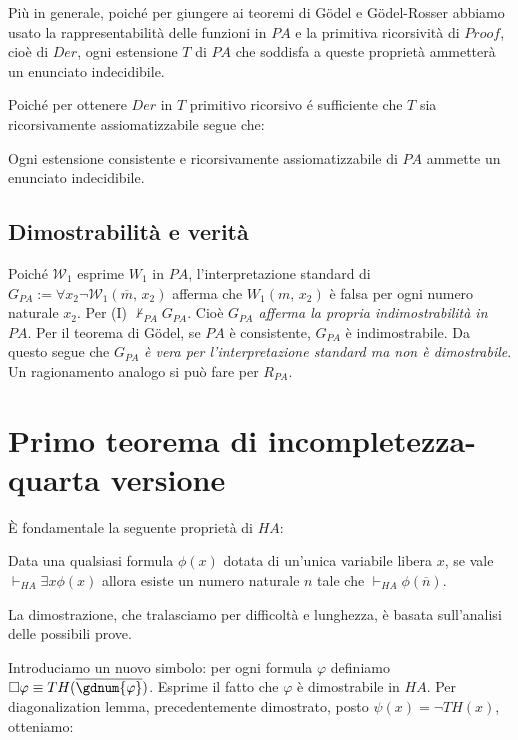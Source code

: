 	Pi\`u in generale, poich\'e per giungere ai teoremi
	di G\"odel e G\"odel-Rosser abbiamo
	usato la rappresentabilit\`a delle funzioni in $PA$ e la primitiva
	ricorsivit\`a di $Proof$, cio\`e di $Der$, ogni estensione $T$ di $PA$ che
	soddisfa a queste propriet\`a ammetter\`a un enunciato indecidibile.
	
	Poich\'e per ottenere $Der$ in $T$ primitivo ricorsivo \'e sufficiente
	che $T$ sia ricorsivamente assiomatizzabile segue che:
	
	\begin{thm}
	Ogni estensione consistente e ricorsivamente assiomatizzabile di $PA$
	ammette un enunciato indecidibile.
	\end{thm}
	
\subsection{Dimostrabilit\`a e verit\`a}
	
	Poich\'e $\mathcal{W}_1$ esprime $W_1$ in $PA$,
	l'interpretazione standard di $G_{PA}:=\forall x_2\neg
	\mathcal{W}_1(\overline{m},\,x_2)$ afferma che $W_1(m,\,x_2)$ \`e falsa per
	ogni numero naturale $x_2$. Per (I) $\not\vdash_{PA}G_{PA}$.
	Cio\`e \textit{$G_{PA}$ afferma la propria indimostrabilit\`a in
	$PA$}. Per il teorema di G\"odel, se $PA$ \`e consistente,
	$G_{PA}$ \`e indimostrabile. Da questo segue che $G_{PA}$ \textit{\`e vera per
	l'interpretazione standard ma non \`e dimostrabile}. Un ragionamento analogo
	si pu\`o fare per $R_{PA}$.
	
\section{Primo teorema di incompletezza-quarta versione}

	\`E fondamentale la seguente propriet\`a di $HA$:

	\begin{thm}
	Data una qualsiasi formula $\phi(x)$ dotata di un'unica variabile libera $x$,
	se vale $\vdash_{HA}\exists x\phi(x)$ allora esiste un numero naturale
	$n$ tale che $\vdash_{HA}\phi(\overline{n})$.
	\end{thm}
	La dimostrazione, che tralasciamo per difficolt\`a e lunghezza,
	\`e basata sull'analisi delle possibili prove.

	Introduciamo un nuovo
	simbolo: per ogni formula $\varphi$ definiamo
	$\Box\varphi\equiv TH(\overline{\gdnum{\varphi}})$.
	Esprime il fatto che $\varphi$ \`e dimostrabile in $HA$.
	Per diagonalization lemma, precedentemente dimostrato,
	posto $\psi(x)=\neg TH(x)$, otteniamo:

